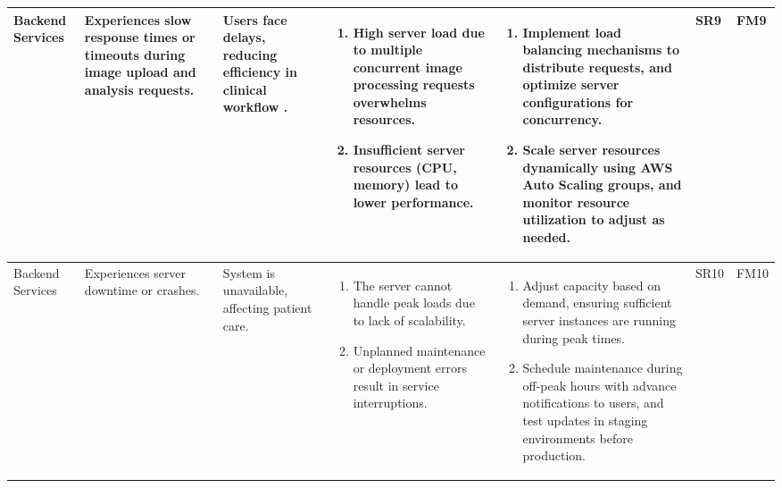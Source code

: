 \documentclass{article}
\begin{document}
\begin{landscape}
\begin{table}[ht]
{\begin{tabular}{|p{2.5cm}|p{2.5cm}|p{3cm}|p{5cm}|p{6cm}|p{1cm}|p{1cm}|}
     Backend Services
     & Experiences slow response times or timeouts during image upload and analysis requests.
     & Users face delays, reducing efficiency in clinical workflow .
     &
     \begin{enumerate}[leftmargin=*, label={\alph*.}, itemsep=1pt]
         \item High server load due to multiple concurrent image processing requests overwhelms resources.
         \item Insufficient server resources (CPU, memory) lead to lower performance.
     \end{enumerate}
     &
     \begin{enumerate}[leftmargin=*, label={\alph*.}, itemsep=1pt]
         \item Implement load balancing mechanisms to distribute requests, and optimize server configurations for concurrency.
         \item Scale server resources dynamically using AWS Auto Scaling groups, and monitor resource utilization to adjust as needed.
     \end{enumerate}
     & SR9 & FM9 \\ \hline

    Backend Services
     & Experiences server downtime or crashes.
     & System is unavailable, affecting patient care.
     &
     \begin{enumerate}[leftmargin=*, label={\alph*.}, itemsep=1pt]
         \item The server cannot handle peak loads due to lack of scalability.
         \item Unplanned maintenance or deployment errors result in service interruptions.
     \end{enumerate}
     &
     \begin{enumerate}[leftmargin=*, label={\alph*.}, itemsep=1pt]
         \item Adjust capacity based on demand, ensuring sufficient server instances are running during peak times.
         \item Schedule maintenance during off-peak hours with advance notifications to users, and test updates in staging environments before production.
     \end{enumerate}
     & SR10 & FM10 \\ \hline

    \end{tabular}
    }
    \end{table}
\end{landscape}
\end{document}
